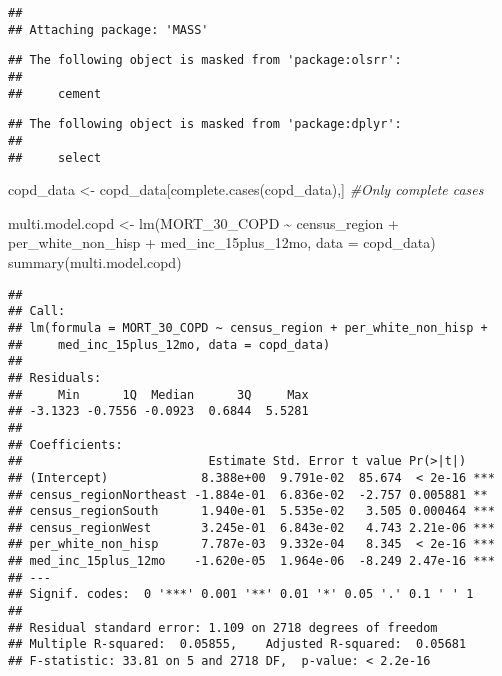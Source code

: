 \documentclass[
]{article}
\newenvironment{Shaded}{\begin{snugshade}}{\end{snugshade}}
\newcommand{\AttributeTok}[1]{\textcolor[rgb]{0.77,0.63,0.00}{#1}}
\newcommand{\CommentTok}[1]{\textcolor[rgb]{0.56,0.35,0.01}{\textit{#1}}}
\newcommand{\FunctionTok}[1]{\textcolor[rgb]{0.00,0.00,0.00}{#1}}
\newcommand{\NormalTok}[1]{#1}
\newcommand{\OtherTok}[1]{\textcolor[rgb]{0.56,0.35,0.01}{#1}}
\newcommand{\SpecialCharTok}[1]{\textcolor[rgb]{0.00,0.00,0.00}{#1}}
\begin{document}
\begin{verbatim}
## 
## Attaching package: 'MASS'
\end{verbatim}

\begin{verbatim}
## The following object is masked from 'package:olsrr':
## 
##     cement
\end{verbatim}

\begin{verbatim}
## The following object is masked from 'package:dplyr':
## 
##     select
\end{verbatim}

\begin{Shaded}
\begin{Highlighting}[]
\NormalTok{copd\_data }\OtherTok{\textless{}{-}}\NormalTok{ copd\_data[}\FunctionTok{complete.cases}\NormalTok{(copd\_data),] }\CommentTok{\#Only complete cases}

\NormalTok{multi.model.copd }\OtherTok{\textless{}{-}} \FunctionTok{lm}\NormalTok{(MORT\_30\_COPD }\SpecialCharTok{\textasciitilde{}}\NormalTok{ census\_region }\SpecialCharTok{+}\NormalTok{ per\_white\_non\_hisp }\SpecialCharTok{+} 
\NormalTok{    med\_inc\_15plus\_12mo, }\AttributeTok{data =}\NormalTok{ copd\_data)}
\FunctionTok{summary}\NormalTok{(multi.model.copd)}
\end{Highlighting}
\end{Shaded}

\begin{verbatim}
## 
## Call:
## lm(formula = MORT_30_COPD ~ census_region + per_white_non_hisp + 
##     med_inc_15plus_12mo, data = copd_data)
## 
## Residuals:
##     Min      1Q  Median      3Q     Max 
## -3.1323 -0.7556 -0.0923  0.6844  5.5281 
## 
## Coefficients:
##                          Estimate Std. Error t value Pr(>|t|)    
## (Intercept)             8.388e+00  9.791e-02  85.674  < 2e-16 ***
## census_regionNortheast -1.884e-01  6.836e-02  -2.757 0.005881 ** 
## census_regionSouth      1.940e-01  5.535e-02   3.505 0.000464 ***
## census_regionWest       3.245e-01  6.843e-02   4.743 2.21e-06 ***
## per_white_non_hisp      7.787e-03  9.332e-04   8.345  < 2e-16 ***
## med_inc_15plus_12mo    -1.620e-05  1.964e-06  -8.249 2.47e-16 ***
## ---
## Signif. codes:  0 '***' 0.001 '**' 0.01 '*' 0.05 '.' 0.1 ' ' 1
## 
## Residual standard error: 1.109 on 2718 degrees of freedom
## Multiple R-squared:  0.05855,    Adjusted R-squared:  0.05681 
## F-statistic: 33.81 on 5 and 2718 DF,  p-value: < 2.2e-16
\end{verbatim}
\end{document}
